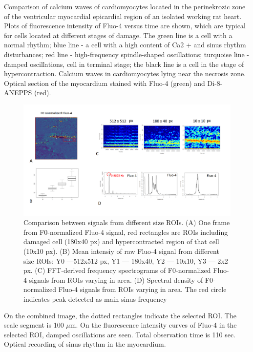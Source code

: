 \documentclass{biophys-new}
\begin{document}
Comparison of calcium waves of cardiomyocytes located in the perinekrozic zone of the ventricular myocardial epicardial region of an isolated working rat heart.
Plots of fluorescence intensity of Fluo-4 versus time are shown, which are typical for cells located at different stages of damage.
The green line is a cell with a normal rhythm; blue line - a cell with a high content of Ca2 + and sinus rhythm disturbances; red line - high-frequency spindle-shaped oscillations; turquoise line - damped oscillations, cell in terminal stage; the black line is a cell in the stage of hypercontraction.
Calcium waves in cardiomyocytes lying near the necrosis zone.
Optical section of the myocardium stained with Fluo-4 (green) and Di-8-ANEPPS (red).

\begin{figure}
    \includegraphics[width=0.9\linewidth]{fig3.png}
    \caption{Comparison between signals from different size ROIs. (A) One frame from F0-normalized Fluo-4 signal, red rectangles are  ROIs including damaged cell (180x40 px) and hypercontracted region of that cell (10x10 px). (B) Mean intensiy of raw Fluo-4 signal from different size ROIs: Y0 ---512x512 px, Y1 --- 180x40, Y2 --- 10x10, Y3 --- 2x2 px. (C) FFT-derived frequency spectrograms of F0-normalized Fluo-4 signals from ROIs varying in area. (D) Spectral density of F0-normalized Fluo-4 signals from ROIs varying in area. The red circle indicates peak detected as main sinus frequency }
    \label{fig:fig3}
\end{figure}


On the combined image, the dotted rectangles indicate the selected ROI.
The scale segment is 100 $\mu$m.
On the fluorescence intensity curves of Fluo-4 in the selected ROI, damped oscillations are seen.
Total observation time is 110 sec.
Optical recording of sinus rhythm in the myocardium.
\end{document}
